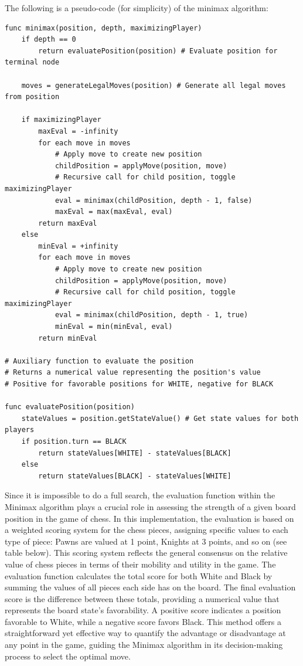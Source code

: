 \documentclass{article}
\begin{document}
The following is a pseudo-code (for simplicity) of the minimax algorithm:

\begin{lstlisting}[caption={Pseudo-Code of the minimax used}, label=lst:pseudocode]
func minimax(position, depth, maximizingPlayer)
    if depth == 0
        return evaluatePosition(position) # Evaluate position for terminal node

    moves = generateLegalMoves(position) # Generate all legal moves from position

    if maximizingPlayer
        maxEval = -infinity
        for each move in moves
            # Apply move to create new position
            childPosition = applyMove(position, move)
            # Recursive call for child position, toggle maximizingPlayer
            eval = minimax(childPosition, depth - 1, false)
            maxEval = max(maxEval, eval)
        return maxEval
    else
        minEval = +infinity
        for each move in moves
            # Apply move to create new position
            childPosition = applyMove(position, move)
            # Recursive call for child position, toggle maximizingPlayer
            eval = minimax(childPosition, depth - 1, true)
            minEval = min(minEval, eval)
        return minEval

# Auxiliary function to evaluate the position
# Returns a numerical value representing the position's value
# Positive for favorable positions for WHITE, negative for BLACK

func evaluatePosition(position)
    stateValues = position.getStateValue() # Get state values for both players
    if position.turn == BLACK
        return stateValues[WHITE] - stateValues[BLACK]
    else
        return stateValues[BLACK] - stateValues[WHITE]

\end{lstlisting}

Since it is impossible to do a full search, the evaluation function within the Minimax algorithm plays a crucial role in assessing the strength of a given board position in the game of chess. In this implementation, the evaluation is based on a weighted scoring system for the chess pieces, assigning specific values to each type of piece: Pawns are valued at 1 point, Knights at 3 points, and so on (see table below). This scoring system reflects the general consensus on the relative value of chess pieces in terms of their mobility and utility in the game. The evaluation function calculates the total score for both White and Black by summing the values of all pieces each side has on the board. The final evaluation score is the difference between these totals, providing a numerical value that represents the board state's favorability. A positive score indicates a position favorable to White, while a negative score favors Black. This method offers a straightforward yet effective way to quantify the advantage or disadvantage at any point in the game, guiding the Minimax algorithm in its decision-making process to select the optimal move.
\end{document}
